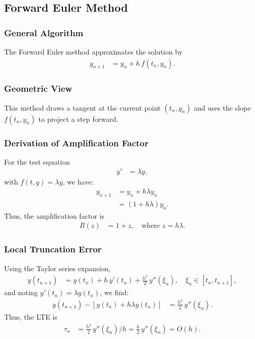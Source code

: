 \documentclass[12pt]{article}
\begin{document}
\subsection{Forward Euler Method}

\subsubsection*{General Algorithm}
The Forward Euler method approximates the solution by 
\begin{align}
y_{n+1} &= y_n + h\, f(t_n,y_n).
\end{align}

\subsubsection*{Geometric View}
This method draws a tangent at the current point $(t_n,y_n)$ and uses the slope $f(t_n,y_n)$ to project a step forward.

\subsubsection*{Derivation of Amplification Factor}
For the test equation 
\begin{align}
y' &= \lambda y,
\end{align}
with $f(t,y)=\lambda y$, we have:
\begin{align}
y_{n+1} &= y_n + h\lambda y_n \\
        &= (1+h\lambda)y_n.
\end{align}
Thus, the amplification factor is 
\begin{align}
R(z) &= 1+z, \quad \text{where } z=h\lambda.
\end{align}

\subsubsection*{Local Truncation Error}
Using the Taylor series expansion,
\begin{align}
y(t_{n+1}) &= y(t_n) + h\, y'(t_n) + \frac{h^2}{2}\, y''(\xi_n),\quad \xi_n\in[t_n,t_{n+1}],
\end{align}
and noting $y'(t_n)=\lambda y(t_n)$, we find:
\begin{align}
y(t_{n+1}) - \left[y(t_n)+h\lambda y(t_n)\right] &= \frac{h^2}{2}\, y''(\xi_n).
\end{align}
Thus, the LTE is 
\begin{align}
\tau_n &= \frac{h^2}{2}\, y''(\xi_n)/h = \frac{h}{2}\, y''(\xi_n) = O(h).
\end{align}
\end{document}
